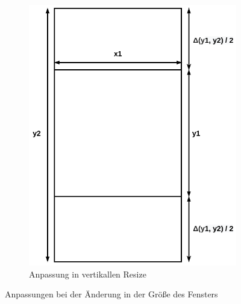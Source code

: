 \documentclass[doktyp=studarbeit]{TUBAFarbeiten}
\begin{document}
\begin{figure}[!htb]
\begin{subfigure}[b]{0.4\textwidth}
        \includegraphics[width=1\linewidth]{display-3.png}
        \caption{Anpassung in vertikallen Resize}
    \end{subfigure}
    \caption{Anpassungen bei der Änderung in der Größe des Fensters}
	\label{fig:display}
\end{figure}
\end{document}
